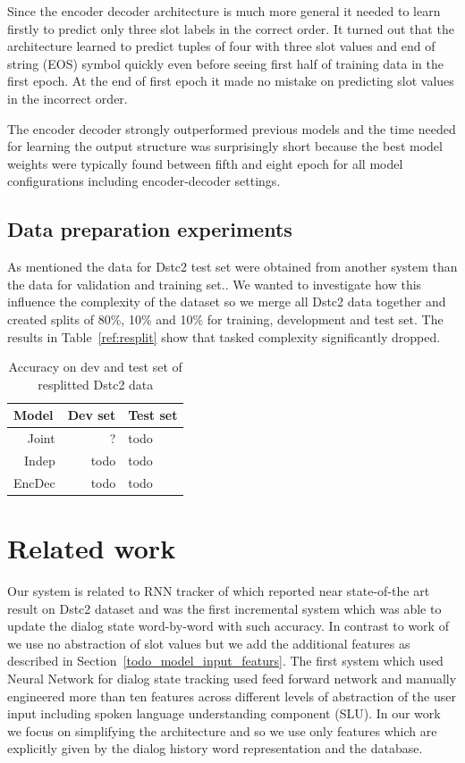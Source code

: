 \documentclass{itatnew}
\begin{document}
Since the encoder decoder architecture is much more general it needed to learn firstly to predict only three slot labels in the correct order.
It turned out that the architecture learned to predict tuples of four with three slot values and end of string (EOS) symbol quickly even before seeing first half of training data in the first epoch.
At the end of first epoch it made no mistake on predicting slot values in the incorrect order.

The encoder decoder strongly outperformed previous models and the time needed for learning the output structure was surprisingly short
because the best model weights were typically found between fifth and eight epoch for all model configurations including encoder-decoder settings.

\subsection{Data preparation experiments}
As mentioned the data for Dstc2 test set were obtained from another system than the data for validation and training set.\cite{verify and cite dstc2}.
We wanted to investigate how this influence the complexity of the dataset so we merge all Dstc2 data together and created splits of 80\%, 10\% and 10\% for training, development and test set.
The results in Table~\ref{ref:resplit} show that tasked complexity significantly dropped.

\begin{table}
\caption{Accuracy on dev and test set of resplitted Dstc2 data}
\begin{center}
\begin{tabular}{r@{\quad}rll}
\hline
\multicolumn{1}{l}{\rule{0pt}{12pt}
                   Model}&\multicolumn{1}{l}{Dev set}&\multicolumn{2}{l}{Test set}\\[2pt]
\hline\rule{0pt}{12pt}
Joint  &     ?&  todo \\
Indep  &   todo& todo \\
EncDec &   todo& todo \\
\hline
\end{tabular}
\end{center}
\label{tab:repslit}
\end{table}

\section{Related work}
Our system is related to RNN tracker of \cite{Zilka} which reported near state-of-the art result on Dstc2 dataset and was the first incremental system which was able to update the dialog state word-by-word with such accuracy.
In contrast to work of \cite{Zilka} we use no abstraction of slot values but we add the additional features as described in Section~\ref{todo_model_input_featurs}.
The first system which used Neural Network for dialog state tracking \cite{henderson} used feed forward network and manually engineered more than ten features across different levels of abstraction of the user input including spoken language understanding component (SLU).
In our work we focus on simplifying the architecture and so we use only features which are explicitly given by the dialog history word representation and the database.
\end{document}
